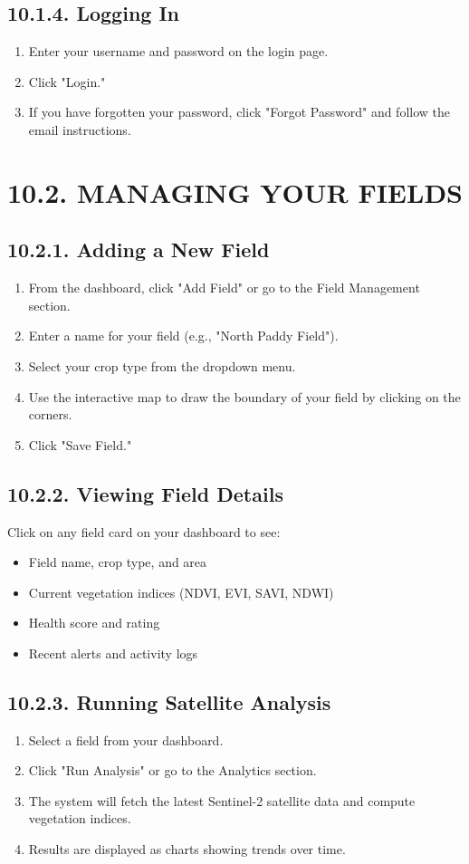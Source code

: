 \documentclass[12pt, a4paper]{report}
\begin{document}
\subsection{10.1.4. Logging In}
\begin{enumerate}[leftmargin=*]
  \item Enter your username and password on the login page.
  \item Click "Login."
  \item If you have forgotten your password, click "Forgot Password" and follow the email instructions.
\end{enumerate}
\section{10.2. MANAGING YOUR FIELDS}
\subsection{10.2.1. Adding a New Field}
\begin{enumerate}[leftmargin=*]
  \item From the dashboard, click "Add Field" or go to the Field Management section.
  \item Enter a name for your field (e.g., "North Paddy Field").
  \item Select your crop type from the dropdown menu.
  \item Use the interactive map to draw the boundary of your field by clicking on the corners.
  \item Click "Save Field."
\end{enumerate}
\subsection{10.2.2. Viewing Field Details}
Click on any field card on your dashboard to see:

\begin{itemize}[leftmargin=*]
  \item Field name, crop type, and area
  \item Current vegetation indices (NDVI, EVI, SAVI, NDWI)
  \item Health score and rating
  \item Recent alerts and activity logs
\end{itemize}
\subsection{10.2.3. Running Satellite Analysis}
\begin{enumerate}[leftmargin=*]
  \item Select a field from your dashboard.
  \item Click "Run Analysis" or go to the Analytics section.
  \item The system will fetch the latest Sentinel-2 satellite data and compute vegetation indices.
  \item Results are displayed as charts showing trends over time.
\end{enumerate}
\end{document}
